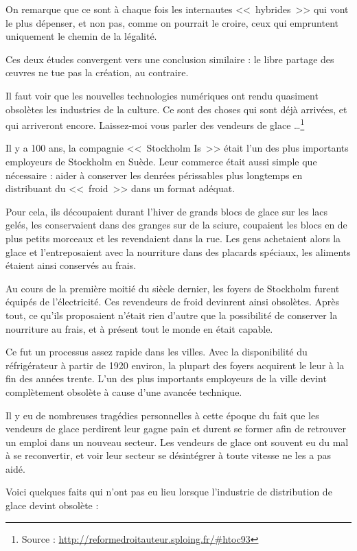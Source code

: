 On remarque que ce sont à chaque fois les internautes <<~hybrides~>> qui vont le plus dépenser, et non pas, comme on pourrait le croire, ceux qui empruntent uniquement le chemin de la légalité.

Ces deux études convergent vers une conclusion similaire : le libre partage des œuvres ne tue pas la création, au contraire.

Il faut voir que les nouvelles technologies numériques ont rendu quasiment obsolètes les industries de la culture.
Ce sont des choses qui sont déjà arrivées, et qui arriveront encore.
Laissez-moi vous parler des vendeurs de glace \dots{}\footnote{Source : \url{http://reformedroitauteur.sploing.fr/\#htoc93}}

Il y a 100 ans, la compagnie <<~Stockholm Is~>> était l'un des plus importants employeurs de Stockholm en Suède.
Leur commerce était aussi simple que nécessaire : aider à conserver les denrées périssables plus longtemps en distribuant du <<~froid~>> dans un format adéquat.

Pour cela, ils découpaient durant l'hiver de grands blocs de glace sur les lacs gelés, les conservaient dans des granges sur de la sciure, coupaient les blocs en de plus petits morceaux et les revendaient dans la rue. Les gens achetaient alors la glace et l'entreposaient avec la nourriture dans des placards spéciaux, les aliments étaient ainsi conservés au frais.

Au cours de la première moitié du siècle dernier, les foyers de Stockholm furent équipés de l'électricité.
Ces revendeurs de froid devinrent ainsi obsolètes.
Après tout, ce qu'ils proposaient n'était rien d'autre que la possibilité de conserver la nourriture au frais, et à présent tout le monde en était capable.

Ce fut un processus assez rapide dans les villes.
Avec la disponibilité du réfrigérateur à partir de 1920 environ, la plupart des foyers acquirent le leur à la fin des années trente.
L'un des plus importants employeurs de la ville devint complètement obsolète à cause d'une avancée technique.

Il y eu de nombreuses tragédies personnelles à cette époque du fait que les vendeurs de glace perdirent leur gagne pain et durent se former afin de retrouver un emploi dans un nouveau secteur. Les vendeurs de glace ont souvent eu du mal à se reconvertir, et voir leur secteur se désintégrer à toute vitesse ne les a pas aidé.

Voici quelques faits qui n'ont pas eu lieu lorsque l'industrie de distribution de glace devint obsolète :

